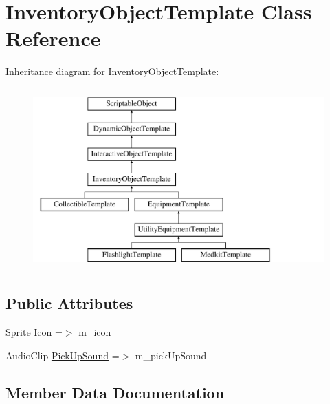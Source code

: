\hypertarget{class_inventory_object_template}{}\section{Inventory\+Object\+Template Class Reference}
\label{class_inventory_object_template}
Inheritance diagram for Inventory\+Object\+Template\+:\begin{figure}[H]
\begin{center}
\leavevmode
\includegraphics[height=7.000000cm]{class_inventory_object_template}
\end{center}
\end{figure}
\subsection*{Public Attributes}
\begin{DoxyCompactItemize}
\item 
Sprite \mbox{\hyperlink{class_inventory_object_template_a45e570a89bc719c26c3adef276ab6ee2}{Icon}} =$>$ m\+\_\+icon
\item 
Audio\+Clip \mbox{\hyperlink{class_inventory_object_template_aad1e883e7f75ff3fc38c53db9ec5b67a}{Pick\+Up\+Sound}} =$>$ m\+\_\+pick\+Up\+Sound
\end{DoxyCompactItemize}


\subsection{Member Data Documentation}
\mbox{\label{class_inventory_object_template_a45e570a89bc719c26c3adef276ab6ee2}} 
